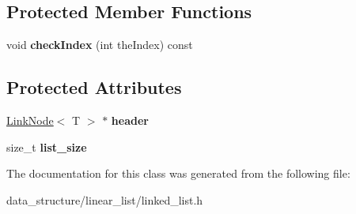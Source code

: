 \subsection*{Protected Member Functions}
\begin{DoxyCompactItemize}
\item 
\mbox{\label{classLinkedList_ac780cc43bb96aaad1dafc72a0dc3afcd}} 
void {\bfseries check\+Index} (int the\+Index) const
\end{DoxyCompactItemize}
\subsection*{Protected Attributes}
\begin{DoxyCompactItemize}
\item 
\mbox{\label{classLinkedList_aa49a3c2b577167f61868002ca3441019}} 
\hyperlink{structLinkNode}{Link\+Node}$<$ T $>$ $\ast$ {\bfseries header}
\item 
\mbox{\label{classLinkedList_adf4e102275c83b4ed732f64ea4c566ee}} 
size\+\_\+t {\bfseries list\+\_\+size}
\end{DoxyCompactItemize}


The documentation for this class was generated from the following file\+:\begin{DoxyCompactItemize}
\item 
data\+\_\+structure/linear\+\_\+list/linked\+\_\+list.\+h\end{DoxyCompactItemize}
